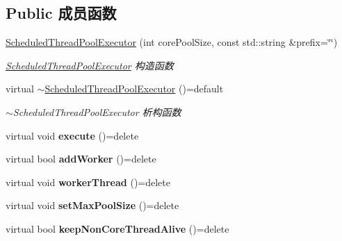 \subsection*{Public 成员函数}
\begin{DoxyCompactItemize}
\item 
\hyperlink{classScheduledThreadPoolExecutor_a880b17439bcdcf9b7542925e24033691}{Scheduled\+Thread\+Pool\+Executor} (int core\+Pool\+Size, const std\+::string \&prefix=\char`\"{}\char`\"{})
\begin{DoxyCompactList}\small\item\em \hyperlink{classScheduledThreadPoolExecutor}{Scheduled\+Thread\+Pool\+Executor} 构造函数 \end{DoxyCompactList}\item 
\mbox{\label{classScheduledThreadPoolExecutor_aa8d3f9083aa92b351be6e134d7a675ea}} 
virtual \hyperlink{classScheduledThreadPoolExecutor_aa8d3f9083aa92b351be6e134d7a675ea}{$\sim$\+Scheduled\+Thread\+Pool\+Executor} ()=default
\begin{DoxyCompactList}\small\item\em $\sim$\+Scheduled\+Thread\+Pool\+Executor 析构函数 \end{DoxyCompactList}\item 
\mbox{\label{classScheduledThreadPoolExecutor_a239910f301ad71b289e132a454f05338}} 
virtual void {\bfseries execute} ()=delete
\item 
\mbox{\label{classScheduledThreadPoolExecutor_aabc3d6fc69ffd19056836a5ad68c2772}} 
virtual bool {\bfseries add\+Worker} ()=delete
\item 
\mbox{\label{classScheduledThreadPoolExecutor_ac302acf3e6fe686bb0b9dc1747c3af26}} 
virtual void {\bfseries worker\+Thread} ()=delete
\item 
\mbox{\label{classScheduledThreadPoolExecutor_a9570da2541929be6c59339de682ec570}} 
virtual void {\bfseries set\+Max\+Pool\+Size} ()=delete
\item 
\mbox{\label{classScheduledThreadPoolExecutor_a028ce032ab4b48dedfed40f0b55bf007}} 
virtual bool {\bfseries keep\+Non\+Core\+Thread\+Alive} ()=delete

\end{DoxyCompactItemize}

